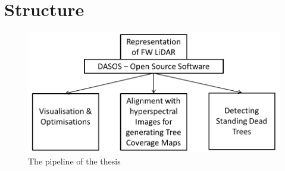 \documentclass{subfiles}
\begin{document}
\section{Structure}

\begin{figure}[!htbp]
	\includegraphics[width=\textwidth]{tex/Pipeline/Pipeline.png}
	\caption{The pipeline of the thesis}
\end{figure}
\end{document}
